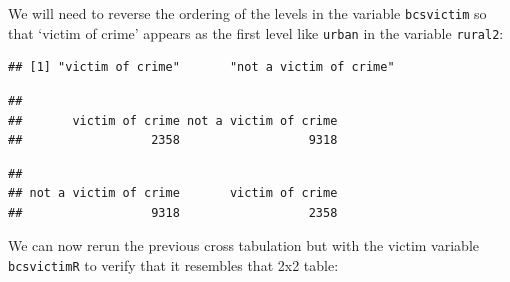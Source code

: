 \documentclass[
]{book}
\newenvironment{Shaded}{\begin{snugshade}}{\end{snugshade}}
\newcommand{\AttributeTok}[1]{\textcolor[rgb]{0.77,0.63,0.00}{#1}}
\newcommand{\CommentTok}[1]{\textcolor[rgb]{0.56,0.35,0.01}{\textit{#1}}}
\newcommand{\FunctionTok}[1]{\textcolor[rgb]{0.00,0.00,0.00}{#1}}
\newcommand{\NormalTok}[1]{#1}
\newcommand{\OtherTok}[1]{\textcolor[rgb]{0.56,0.35,0.01}{#1}}
\newcommand{\SpecialCharTok}[1]{\textcolor[rgb]{0.00,0.00,0.00}{#1}}
\newcommand{\StringTok}[1]{\textcolor[rgb]{0.31,0.60,0.02}{#1}}
\begin{document}
We will need to reverse the ordering of the levels in the variable \texttt{bcsvictim} so that `victim of crime' appears as the first level like \texttt{urban} in the variable \texttt{rural2}:

\begin{Shaded}
\end{Shaded}

\begin{verbatim}
## [1] "victim of crime"       "not a victim of crime"
\end{verbatim}

\begin{Shaded}
\end{Shaded}

\begin{verbatim}
## 
##       victim of crime not a victim of crime 
##                  2358                  9318
\end{verbatim}

\begin{Shaded}
\end{Shaded}

\begin{verbatim}
## 
## not a victim of crime       victim of crime 
##                  9318                  2358
\end{verbatim}

We can now rerun the previous cross tabulation but with the victim variable \texttt{bcsvictimR} to verify that it resembles that 2x2 table:
\end{document}
